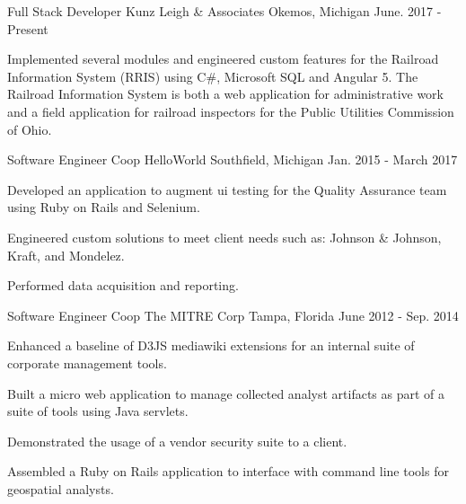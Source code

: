 
\begin{cventries}

  \cventry
    {Full Stack Developer} %
    {Kunz Leigh \& Associates} %
    {Okemos, Michigan} %
    {June. 2017 - Present} %
    {
      \begin{cvitems} %
        \item {Implemented several modules and engineered custom features for the Railroad Information System (RRIS) using C\#, Microsoft SQL and Angular 5. The Railroad Information System is both a web application for administrative work and a field application for railroad inspectors for the Public Utilities Commission of Ohio.}
      \end{cvitems}
    }

\cventry
  {Software Engineer Coop} %
  {HelloWorld} %
  {Southfield, Michigan} %
  {Jan. 2015 - March 2017} %
  {
    \begin{cvitems} %
    \item {Developed an application to augment ui testing for the Quality Assurance team using Ruby on Rails and Selenium.}
    \item {Engineered custom solutions to meet client needs such as: Johnson \& Johnson, Kraft, and Mondelez.}
    \item {Performed data acquisition and reporting.}
    \end{cvitems}
  }

\cventry
  {Software Engineer Coop} %
  {The MITRE Corp} %
  {Tampa, Florida} %
  {June 2012 - Sep. 2014} %
  {
    \begin{cvitems} %
      \item {Enhanced a baseline of D3JS mediawiki extensions for an internal suite of corporate management tools.}
      \item {Built a micro web application to manage collected analyst artifacts as part of a suite of tools using Java servlets.}
      \item {Demonstrated the usage of a vendor security suite to a client.}
      \item {Assembled a Ruby on Rails application to interface with command line tools for geospatial analysts.}
    \end{cvitems}
  }

\end{cventries}
